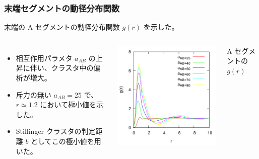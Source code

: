 \documentclass[12pt, dvipdfmx]{beamer}
\begin{document}
\begin{frame}
\frametitle{末端セグメントの動径分布関数}
末端の A セグメントの動径分布関数 $g(r)$ を示した。
\begin{columns}[T, totalwidth=\linewidth]
	\begin{itemize}
	\item
	相互作用パラメタ $a_{AB}$ の上昇に伴い、クラスタ中の偏析が増大。
	\item
	斥力の無い $a_{AB}=25$ で、 $r\simeq1.2$ において極小値を示した。
	\item
	Stillinger クラスタの判定距離 $b$ としてこの極小値を用いた。
	\end{itemize}	
	\includegraphics[width=\columnwidth]{./fig/gr_all.pdf}

	\centering
	A セグメントの $g(r)$
\end{columns}

\end{frame}
\end{document}
